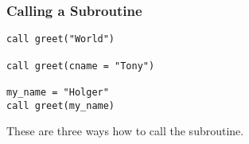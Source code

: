 \begin{frame}[fragile]
  \frametitle{Calling a Subroutine}

  \begin{lstlisting}[numbers=none]
call greet("World")

call greet(cname = "Tony")

my_name = "Holger"
call greet(my_name)
  \end{lstlisting}

  These are three ways how to call the subroutine. 

\end{frame}

\begin{frame}[fragile]
  \frametitle{}

  \begin{lstlisting}
  \end{lstlisting}

\end{frame}

\begin{frame}[fragile]
  \frametitle{}

  \begin{lstlisting}
  \end{lstlisting}

\end{frame}
